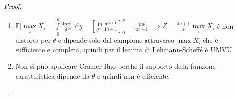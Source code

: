\documentclass[hidelinks, 10pt]{report}
\begin{document}
\begin{proof}
\begin{enumerate}
$ T $ \`e completa se $ \mathbb{E}_{\theta} [g(T)] = 0, \forall\ \theta \implies g(x) \equiv 0, \mathbb{P}_{\theta} $-q.c., $ \forall\ \theta $. Quindi $ \mathbb{E}_{\theta} [g(T)] = \int\limits_{0}^{\theta} \frac{4 n y^{4n - 1}}{\theta^{4n}} g(y) \, \mathrm{d}y = 0, \forall\ \theta > 0 \iff \int\limits_{0}^{\theta} y^{4n - 1} g(y) \, \mathrm{d}y = 0, \forall\ \theta > 0 $. Derivando rispetto a $ \theta $ si ottiene che $ \theta^{4n - 1} g(\theta) = 0, \forall\ \theta > 0 \iff g(\theta) = 0, \forall\ \theta > 0 \implies g(\theta) = 0, \mathbb{P}_{\theta} $-q.c., $ \forall\ \theta > 0 $
\item $ \mathbb{E} [\max\limits_{i} X_{i} = \int\limits_{0}^{\theta} \frac{4 n y^{4n}}{\theta^{4n}} \, \mathrm{d}y = \left[ \frac{4n}{\theta^{4n}} \frac{y^{4n + 1}}{4n + 1} \right]^{\theta}_{0} = \frac{4n \theta}{4n + 1} \implies Z = \frac{4n + 1}{4n} \max\limits_{i} X_{i} $ \`e non distorto per $ \theta $ e dipende solo dal campione attraverso $ \max X_{i} $ che \`e sufficiente e completa, quindi per il lemma di Lehmann-Scheff\'e \`e UMVU
\item Non si pu\`o applicare Cramer-Rao perch\'e il supporto della funzione caratteristica dipende da $ \theta $ e quindi non \`e efficiente.
\end{enumerate}
\end{proof}
\end{document}
